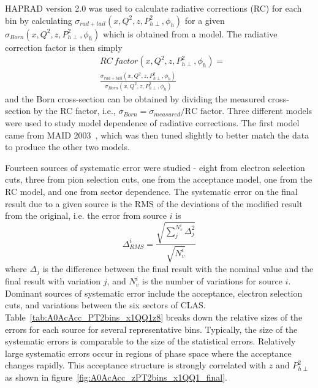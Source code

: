 \documentclass[aps,prl,twocolumn,showpacs,superscriptaddress,groupedaddress]{revtex4-1}  %
\begin{document}
HAPRAD version 2.0 \cite{Akushevich:1999hz,Akushevich:2007jc} was used to calculate radiative corrections (RC) for each bin by calculating $\sigma_{rad+tail} \left( x, Q^2, z, P_{h\perp}^2, \phi_h \right)$ for a given \allowbreak $\sigma_{Born} \left( x, Q^2, z, P_{h\perp}^2, \phi_h \right)$ which is obtained from a model.
The radiative correction factor is then simply
\begin{equation}
\begin{split}
\label{eq:RCfactor}
& RC\ factor \left( x, Q^2, z, P_{h\perp}^2, \phi_h \right) =
\\
& \frac{\sigma_{rad+tail} \left( x, Q^2, z, P_{h\perp}^2, \phi_h \right)}{\sigma_{Born} \left( x, Q^2, z, P_{h\perp}^2, \phi_h \right)}
\end{split}
\end{equation}
and the Born cross-section can be obtained by dividing the measured cross-section by the RC factor, i.e., $\sigma_{Born} = \sigma_{measured}/\text{RC factor}$.
Three different models were used to study model dependence of radiative corrections.
The first model came from MAID 2003~\cite{Drechsel:1999}, which was then tuned slightly to better match the data to produce the other two models.

Fourteen sources of systematic error were studied - eight from electron selection cuts, three from pion selection cuts, one from the acceptance model, one from the RC model, and one from sector dependence.
The systematic error on the final result due to a given source is the RMS of the deviations of the modified result from the original, i.e. the error from source $i$ is
%
\begin{equation}
\label{eq:RMS}
\Delta_{RMS}^i = \frac{\sqrt{\sum_j^{N_v^i} \Delta_j^2}}{\sqrt{N_v^i}}
\end{equation}
%
where $\Delta_j$ is the difference between the final result with the nominal value and the final result with variation $j$, and $N_v^i$ is the number of variations for source $i$.
Dominant sources of systematic error include the acceptance, electron selection cuts, and variations between the six sectors of CLAS.
Table~\ref{tab:A0AcAcc_PT2bins_x1QQ1z8} breaks down the relative sizes of the errors for each source for several representative bins.
Typically, the size of the systematic errors is comparable to the size of the statistical errors.
Relatively large systematic errors occur in regions of phase space where the acceptance changes rapidly.
This acceptance structure is strongly correlated with $z$ and $P_{h\perp}^2$ as shown in figure~\ref{fig:A0AcAcc_zPT2bins_x1QQ1_final}.
\end{document}
